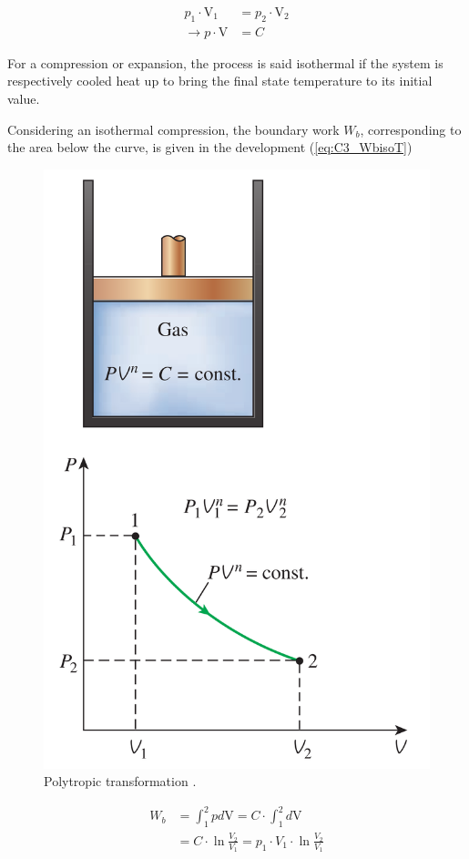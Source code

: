   \begin{align}
    p_1\cdot \mathrm{V}_1 &= p_2\cdot \mathrm{V}_2\nonumber\\
    \rightarrow p\cdot \mathrm{V} &= C \label{eq:C3_isoT}  
  \end{align}

 For a compression or expansion, the process is said isothermal if the system is respectively cooled heat up to bring the final state temperature to its initial value.
 
Considering an isothermal compression, the boundary work $W_b$, corresponding to the area below the curve, is given in the development (\ref{eq:C3_WbisoT})

\begin{figure}
  \centering
  \includegraphics{poly.png}
  \caption{Polytropic transformation \cite{2015}.}
  \label{fig:C3_poly}
\end{figure}
\begin{align}
  W_b &= \int_1^2 pd\mathrm{V} = C\cdot\int_1^2d\mathrm{V}\nonumber\\
  &= C\cdot \ln \frac{V_2}{V_1} = p_1\cdot V_1\cdot \ln \frac{V_2}{V_1} \label{eq:C3_WbisoT}
\end{align}
